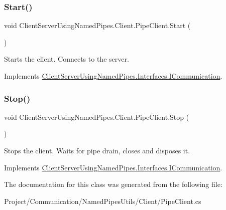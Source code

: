 \subsubsection{\texorpdfstring{Start()}{Start()}}
{\footnotesize\ttfamily void Client\+Server\+Using\+Named\+Pipes.\+Client.\+Pipe\+Client.\+Start (\begin{DoxyParamCaption}{ }\end{DoxyParamCaption})\hspace{0.3cm}{\ttfamily [inline]}}



Starts the client. Connects to the server. 



Implements \hyperlink{interface_client_server_using_named_pipes_1_1_interfaces_1_1_i_communication_ac06ad36a2b8a02d82e385e0eade28671}{Client\+Server\+Using\+Named\+Pipes.\+Interfaces.\+I\+Communication}.

\mbox{\label{class_client_server_using_named_pipes_1_1_client_1_1_pipe_client_a9d442b0b2a19c3d460185a8bb27e36e9}} 
\subsubsection{\texorpdfstring{Stop()}{Stop()}}
{\footnotesize\ttfamily void Client\+Server\+Using\+Named\+Pipes.\+Client.\+Pipe\+Client.\+Stop (\begin{DoxyParamCaption}{ }\end{DoxyParamCaption})\hspace{0.3cm}{\ttfamily [inline]}}



Stops the client. Waits for pipe drain, closes and disposes it. 



Implements \hyperlink{interface_client_server_using_named_pipes_1_1_interfaces_1_1_i_communication_a85ce939996cde20d398e799ca6a900f3}{Client\+Server\+Using\+Named\+Pipes.\+Interfaces.\+I\+Communication}.



The documentation for this class was generated from the following file\+:\begin{DoxyCompactItemize}
\item 
Project/\+Communication/\+Named\+Pipes\+Utils/\+Client/Pipe\+Client.\+cs\end{DoxyCompactItemize}
